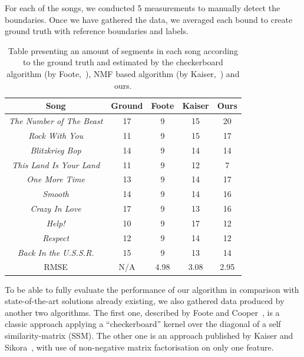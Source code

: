 For each of the songs, we conducted 5 measurements to manually detect the boundaries. Once we have gathered the data, we averaged each bound to create ground truth with reference boundaries and labels.



\begin{table}
\begin{center}
\begin{tabular}{| c | c | c | c | c | } \hline 
Song  											& Ground	& Foote 	&  Kaiser 	& Ours \\ \hline \hline
\textit{The Number of The Beast} 	&	17			& 	9  			&  15 		&  20   	\\ \hline
\textit{Rock With You}						&	11			&  9			&  15 		& 17   	\\ \hline
\textit{Blitzkrieg Bop} 						&	14			&  9  			&  14 		& 14   	\\ \hline
\textit{This Land Is Your Land} 		&	11			&  9			&  12 		& 7    	\\ \hline
\textit{One More Time}					&	13			&  9    		&  14 		& 17   	\\ \hline
\textit{Smooth}								&	14			&  9  			&  14 		& 16  	\\ \hline
\textit{Crazy In Love}						&	17			&  9  			&  13  		& 16   	\\ \hline
\textit{Help!}									&	10			&  9		   	&  17 		& 12   	\\ \hline
\textit{Respect}								&	12			&  9  			&  14 		& 12  	\\ \hline
\textit{Back In the U.S.S.R.}				&	15			&  9  			&  13		    	& 14		\\ \hline \hline
RMSE											&	N/A		& 4.98		&  3.08		& 2.95	\\ \hline 

\end{tabular}
\caption{Table presenting an amount of segments in each song according to the ground truth and estimated by the checkerboard algorithm (by Foote,~\cite{FooteCooper}), NMF based algorithm (by Kaiser,~\cite{Sikora}) and ours.}
\label{table:evalStructureCount}
\end{center}
\end{table}

To be able to fully evaluate the performance of our algorithm in comparison with state-of-the-art solutions already existing, we also gathered data produced by another two algorithms. The first one, described by Foote and Cooper~\cite{FooteCooper}, is a classic approach applying a ``checkerboard'' kernel over the diagonal of a self similarity-matrix (SSM). The other one is an approach published by Kaiser and Sikora~\cite{Sikora}, with use of non-negative matrix factorisation on only one feature. 

